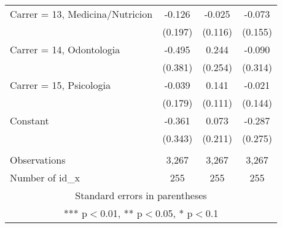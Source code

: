 \documentclass[]{article}
\begin{document}
\begin{tabular}{lccc}
Carrer = 13, Medicina/Nutricion & -0.126 & -0.025 & -0.073 \\
 & (0.197) & (0.116) & (0.155) \\
Carrer = 14, Odontologia & -0.495 & 0.244 & -0.090 \\
 & (0.381) & (0.254) & (0.314) \\
Carrer = 15, Psicologia & -0.039 & 0.141 & -0.021 \\
 & (0.179) & (0.111) & (0.144) \\
Constant & -0.361 & 0.073 & -0.287 \\
 & (0.343) & (0.211) & (0.275) \\
 &  &  &  \\
Observations & 3,267 & 3,267 & 3,267 \\
 Number of id\_x & 255 & 255 & 255 \\ \hline
\multicolumn{4}{c}{ Standard errors in parentheses} \\
\multicolumn{4}{c}{ *** p$<$0.01, ** p$<$0.05, * p$<$0.1} \\
\end{tabular}
\end{document}
